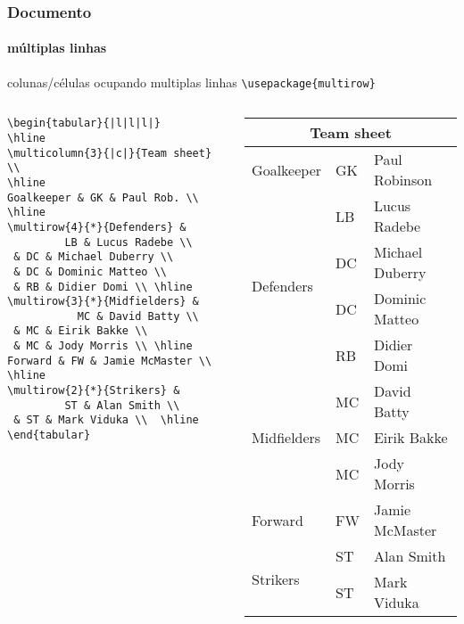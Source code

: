 \begin{frame}[fragile]
\frametitle{Documento}
\framesubtitle{múltiplas linhas}
  \scriptsize 
  colunas/células ocupando multiplas linhas \verb|\usepackage{multirow}|
  \begin{columns}[c]
  \vspace{-0.2cm}
  \scriptsize
  \begin{verbatim}
\begin{tabular}{|l|l|l|}
\hline
\multicolumn{3}{|c|}{Team sheet} \\
\hline
Goalkeeper & GK & Paul Rob. \\ \hline
\multirow{4}{*}{Defenders} & 
         LB & Lucus Radebe \\
 & DC & Michael Duberry \\
 & DC & Dominic Matteo \\
 & RB & Didier Domi \\ \hline
\multirow{3}{*}{Midfielders} & 
           MC & David Batty \\
 & MC & Eirik Bakke \\
 & MC & Jody Morris \\ \hline
Forward & FW & Jamie McMaster \\ \hline
\multirow{2}{*}{Strikers} & 
         ST & Alan Smith \\
 & ST & Mark Viduka \\  \hline
\end{tabular}
  \end{verbatim}
  \begin{fmpage}{\textwidth}
\begin{tabular}{|l|l|l|}
\hline
\multicolumn{3}{|c|}{Team sheet} \\
\hline
Goalkeeper & GK & Paul Robinson \\ \hline
\multirow{4}{*}{Defenders} & LB & Lucus Radebe \\
 & DC & Michael Duberry \\
 & DC & Dominic Matteo \\
 & RB & Didier Domi \\ \hline
\multirow{3}{*}{Midfielders} & MC & David Batty \\
 & MC & Eirik Bakke \\
 & MC & Jody Morris \\ \hline
Forward & FW & Jamie McMaster \\ \hline
\multirow{2}{*}{Strikers} & ST & Alan Smith \\
 & ST & Mark Viduka \\
\hline
\end{tabular}
  \end{fmpage}
  \end{columns}
\end{frame}


